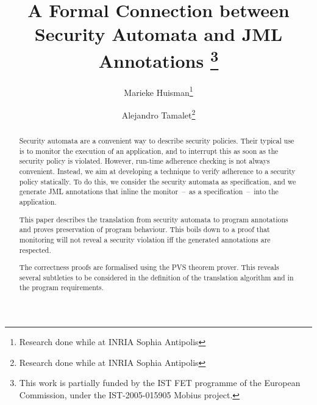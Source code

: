 \documentclass[]{llncs}
\title{A Formal Connection between Security Automata and JML Annotations
\thanks{This work is partially funded by the IST FET
programme of the European Commission, under the IST-2005-015905
\textsf{Mobius} project.}}
\author{Marieke Huisman\inst{1}\thanks{Research done while at INRIA Sophia Antipolis} \and Alejandro Tamalet\inst{2}\thanks{Research done while at INRIA Sophia Antipolis}}
\institute{University of Twente, Netherlands \and
University of Nijmegen, Netherlands}
\begin{document}
\maketitle
\begin{abstract}
Security automata are a convenient way to describe security
policies. Their typical use is to monitor the execution of an
application, and to interrupt this as soon as the security policy is
violated. However, run-time adherence checking is not always
convenient. Instead, we aim at developing a technique to verify
adherence to a security policy statically.  To do this, we consider
the security automata as specification, and we generate JML
annotations that inline the monitor~--~as a specification~--~into the
application.

%
This paper describes the translation from security automata to program
annotations and proves preservation of program behaviour. This boils
down to a proof that monitoring will not reveal a security violation
iff the generated annotations are respected.

%
%
The correctness proofs are formalised using the PVS theorem prover.
This reveals several subtleties to be considered in the definition of the
translation algorithm and in the program requirements.
\end{abstract}










%

\end{document}
